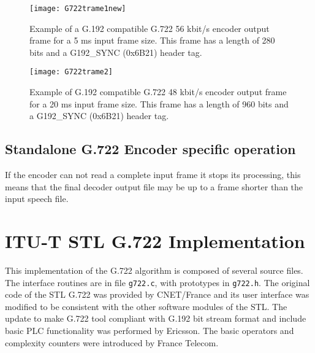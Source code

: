 \pagebreak 

\begin{figure}[hbt]
    \begin{center}
        \texttt{[image: G722trame1new]}
	    \caption{ Example of a G.192 compatible G.722 56 kbit/s encoder output frame for a 5 ms input frame size. This frame						has a length of 280 bits and a G192\_SYNC (0x6B21) header tag.
        \label{fig:G722trame1}}
	 \end{center}
\end{figure}

\begin{figure}[h]
    \begin{center}
        \texttt{[image: G722trame2]}
  \end{center}
  \caption{Example of G.192 compatible G.722 48 kbit/s encoder output frame for a 20 ms input frame size. This frame has a length of 960 bits and a G192\_SYNC (0x6B21) header tag.
           \label{fig:G722trame2}}
\end{figure}

\subsection{Standalone G.722 Encoder specific operation}

If the encoder can not read a complete input frame it stops its processing, this means that the final decoder output file may be up to a frame shorter than the input speech file. 

\pagebreak 

\section{ITU-T STL G.722 Implementation}

This implementation of the G.722 algorithm is composed of several
source files. The interface routines are in file {\tt g722.c}, with
prototypes in {\tt g722.h}. The original code of the STL G.722 was
provided by CNET/France and its user interface was modified to be
consistent with the other software modules of the STL. The update to
make G.722 tool compliant with G.192 bit stream format and include
basic PLC functionality was performed by Ericsson. The basic operators
and complexity counters were introduced by France Telecom.

